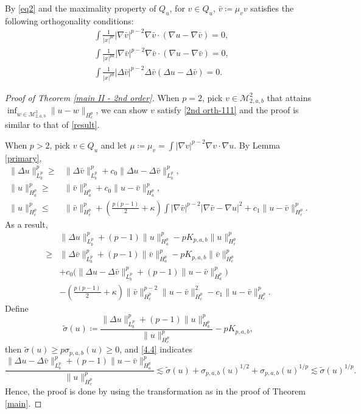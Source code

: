 \documentclass[11pt]{article}
\numberwithin{equation}{section}
\begin{document}
By \eqref{eq2} and the maximality property of $Q_u$, for $v\in Q_u$, $\bar v \coloneqq \mu_v v$ satisfies the following orthogonality conditions:
\begin{equation}\label{2nd orth-111}
    \begin{aligned}
        & \int \frac{1}{|x|^{pc}}|\nabla \bar v|^{p-2}\nabla \bar v\cdot (\nabla u-\nabla \bar v) = 0, \\
        & \int \frac{1}{|x|^{pa}} |\nabla \bar v|^{p-2}\nabla \bar{v}\cdot (\nabla u-\nabla \bar v) = 0,\\
        & \int \frac{1}{|x|^{pb}}|\Delta \bar v|^{p-2}\Delta\bar v(\Delta u-\Delta \bar v) = 0.
    \end{aligned}
\end{equation}
\begin{proof}[Proof of Theorem \ref{main II - 2nd order}]
    When $p=2$, pick $v\in \mathcal{M}_{2,a,b}^2$ that attains $\inf_{w\in \mathcal{M}_{2,a,b}^2}\|u-w\|_{H_c^p}$, we can show $v$ satisfy \eqref{2nd orth-111} and the proof is similar to that of \eqref{result}.

    When $p>2$, pick $v\in Q_u$ and let $\mu \coloneqq \mu_v = \int |\nabla v|^{p-2}\nabla v\cdot \nabla u$. By Lemma \ref{primary},
    \begin{align*}
        \|\Delta u\|_{L_b^p}^p \ge{}& \|\Delta \bar v \|_{L_b^p}^p + c_0\|\Delta u-\Delta \bar v\|_{L_b^p}^p, \\
        \|u\|_{H_a^p}^p \ge{}& \|\bar v\|_{H_a^p}^p + c_0\|u-\bar v\|_{H_a^p}^p,\\
        \|u\|_{H_c^p}^p \le{}& \|\bar v\|_{H_c^p}^p + \left(\frac{p(p-1)}{2}+ \kappa\right)\int |\nabla \bar v|^{p-2}|\nabla \bar v-\nabla u|^2 + c_1\|u-\bar v\|_{H_c^p}^p.
    \end{align*}
    As a result,
    \begin{equation}\label{4.4}
        \begin{aligned}
            & \| \Delta u\|_{L_b^p}^p + (p-1)\|u\|_{H_a^p}^p
        -pK_{p,a,b}\|u\|_{H_c^p}^p\\
            \ge{}& \|\Delta \bar v\|_{L_b^p}^p + (p-1)\|\bar v\|_{H_a^p}^p-pK_{p,a,b}\|\bar v\|_{H_c^p}^p\\
            & + c_0\Big( \|\Delta u-\Delta \bar v\|_{L_b^p}^p + (p-1)\|u-\bar v\|_{H_a^p}^p \Big)\\
            & -\left(\frac{p(p-1)}{2}+\kappa\right)\|\bar v\|_{H_c^p}^{p-2}\|u-\bar v\|_{H_c^p}^2 - c_1\|u-\bar v\|_{H_c^p}^p.
        \end{aligned}
    \end{equation}
    Define
    \[ \tilde{\sigma}(u)\coloneqq \frac{\|\Delta u\|_{L_b^p}^p + (p-1)\|u\|_{H_a^p}^p}{\|u\|_{H_c^p}^p} - pK_{p,a,b},\]
    then $\tilde{\sigma}(u)\ge p\sigma_{p,a,b}(u)\ge 0$, and \eqref{4.4} indicates
    \begin{equation*}
        \frac{\|\Delta u-\Delta \bar v\|_{L_b^p}^p + (p-1)\|u-\bar v\|_{H_a^p}^p}{\|u\|_{H_c^p}^p} \lesssim \tilde{\sigma}(u) + \sigma_{p,a,b}(u)^{1/2}+\sigma_{p,a,b}(u)^{1/p}\lesssim \tilde{\sigma}(u)^{1/p}.
    \end{equation*}
    Hence, the proof is done by using the transformation as in the proof of Theorem \ref{main}.
\end{proof}
\end{document}
